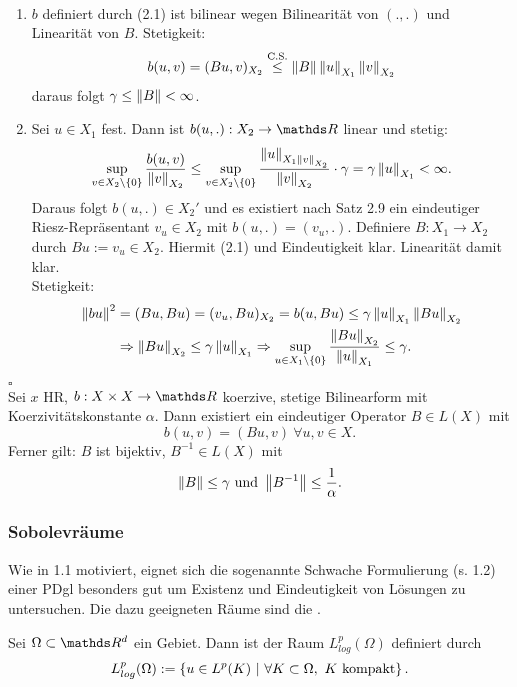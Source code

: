 \\
\begin{enumerate}[(1)]
	\item $b$ definiert durch (2.1) ist bilinear wegen Bilinearität von $(.,.)$ und Linearität von $B$.
	Stetigkeit:
	\[
	b(u,v) = (Bu,v)_{X_2} \stackrel{\text{C.S.}}{\le} \left\Vert B\right\Vert\left\Vert u\right\Vert_{X_1}\left\Vert v\right\Vert_{X_2}
	\]
	daraus folgt $\gamma \le \left\Vert B\right\Vert < \infty$.
	\item Sei $u\in X_1$ fest.
	Dann ist $b(u,.):X_2\to\R$ linear und stetig:
	\[
	\sup\limits_{v\in X_2\backslash\{0\}} \frac{b(u,v)}{\left\Vert v\right\Vert_{X_2}} \le \sup\limits_{v\in X_2\backslash\{0\}} \frac{\left\Vert u\right\Vert_{X_1\left\Vert v\right\Vert_{X_2}}}{\left\Vert v\right\Vert_{X_2}}\cdot \gamma = \gamma \left\Vert u\right\Vert_{X_1} < \infty.
	\]
	Daraus folgt $b(u,.)\in X_2'$ und es existiert nach Satz 2.9 ein eindeutiger Riesz-Repräsentant $v_u\in X_2$ mit $b(u,.) = (v_u,.)$.
	Definiere $B:X_1\to X_2$ durch $Bu := v_u\in X_2$.
	Hiermit (2.1) und Eindeutigkeit klar.
	Linearität damit klar.\\
	Stetigkeit:
	\begin{align*}
	\left\Vert bu\right\Vert^2 &= (Bu,Bu) = (v_u,Bu)_{X_2} = b(u,Bu) \le \gamma \left\Vert u\right\Vert_{X_1}\left\Vert Bu\right\Vert_{X_2}\\
	&\Rightarrow \left\Vert Bu\right\Vert_{X_2} \le \gamma \left\Vert u\right\Vert_{X_1} \Rightarrow \sup\limits_{u\in X_1\backslash\{0\}} \frac{\left\Vert Bu\right\Vert_{X_2}}{\left\Vert u\right\Vert_{X_1}} \le \gamma.
	\end{align*}
\end{enumerate}
\hfill $\square$\\

Sei $x$ HR, $b:X\times X\to\R$ koerzive, stetige Bilinearform mit Koerzivitätskonstante $\alpha$.
Dann existiert ein eindeutiger Operator $B\in L(X)$ mit
\[
b(u,v) = (Bu,v)~\forall u,v\in X.
\]
Ferner gilt: $B$ ist bijektiv, $B^{-1}\in L(X)$ mit
\[
\left\Vert B\right\Vert \le \gamma \text{ und } \left\Vert B^{-1}\right\Vert\le \frac{1}{\alpha}.
\]

\subsubsection{Sobolevräume}

Wie in 1.1 motiviert, eignet sich die sogenannte Schwache Formulierung (s. 1.2) einer PDgl besonders gut um Existenz und Eindeutigkeit von Lösungen zu untersuchen.
Die dazu geeigneten Räume sind die .

Sei $\Omega\subset \R^d$ ein Gebiet.
Dann ist der Raum $L_{log}^p(\Omega)$ definiert durch 
\[
L_{log}^p(\Omega) := \left\{u\in L^p(K) ~|~ \forall K\subset \Omega,~ K\text{ kompakt}\right\}.
\]

